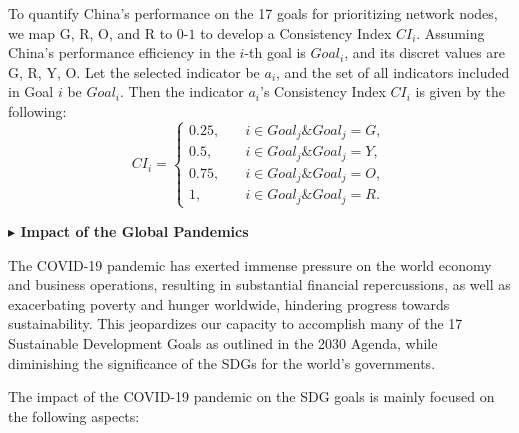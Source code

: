 \documentclass[12pt]{article}  %
\begin{document}
To quantify China’s performance on the 17 goals for prioritizing network nodes, we map G, R, O, and R to $0$-$1$ to develop a Consistency Index $CI_i$. 
Assuming China's performance efficiency in the $i$-th goal is $Goal_i$, and its discret
 values are G, R, Y, O.
Let the selected indicator be $a_i$, and the set of all indicators included in Goal $i$ be $Goal_i$. Then the indicator $a_i$'s  Consistency Index   $CI_i$ is given by the following:
\begin{equation*}CI_i=
\begin{cases}0.25,\quad &i\in Goal_j\& Goal_j=G,\\0.5,\quad &i\in Goal_j\&Goal_j=Y,\\0.75,\quad &i \in Goal_j\&Goal_j=O,\\1,\quad &i \in Goal_j\&Goal_j=R.
\end{cases}
\end{equation*}

\vspace{0.7mm}\begin{itshape}
\textbf{$\blacktriangleright$ Impact of the Global Pandemics}\end{itshape}

The COVID-19 pandemic has exerted immense pressure on the world economy and business operations, resulting in substantial financial repercussions, as well as exacerbating poverty and hunger worldwide, hindering progress towards sustainability. This jeopardizes our capacity to accomplish many of the 17 Sustainable Development Goals as outlined in the 2030 Agenda, while diminishing the significance of the SDGs for the world’s governments. 



The impact of the COVID-19 pandemic on the SDG goals is mainly focused on the following aspects:
\end{document}
